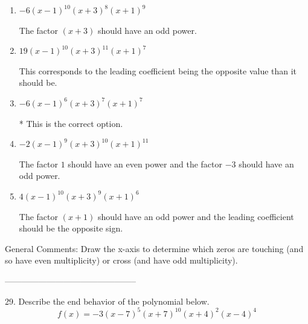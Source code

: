 \documentclass{article}[14pt]
\begin{document}
\begin{enumerate}[label=\Alph*.] 
\item $ -6(x - 1)^{10} (x + 3)^{8} (x + 1)^{9} $ 

 The factor $(x + 3)$ should have an odd power. 
\item $ 19(x - 1)^{10} (x + 3)^{11} (x + 1)^{7} $ 

 This corresponds to the leading coefficient being the opposite value than it should be. 
\item $ -6(x - 1)^{6} (x + 3)^{7} (x + 1)^{7} $ 

 * This is the correct option. 
\item $ -2(x - 1)^{9} (x + 3)^{10} (x + 1)^{11} $ 

 The factor $1$ should have an even power and the factor $-3$ should have an odd power. 
\item $ 4(x - 1)^{10} (x + 3)^{9} (x + 1)^{6} $ 

 The factor $(x + 1)$ should have an odd power and the leading coefficient should be the opposite sign. 
\end{enumerate} 
 
General Comments: Draw the x-axis to determine which zeros are touching (and so have even multiplicity) or cross (and have odd multiplicity).

-----------------------------------------------

29. Describe the end behavior of the polynomial below.
$$ f(x) = -3(x - 7)^{5}(x + 7)^{10}(x + 4)^{2}(x - 4)^{4} $$ 
\end{document}
